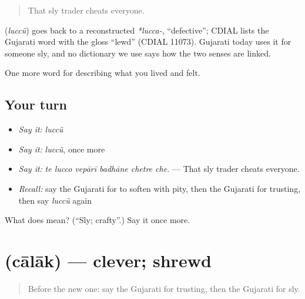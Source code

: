 \begin{quote}
That sly trader cheats everyone.
\end{quote}

\begin{cousinweb}
\textbf{} (\emph{luccũ}) goes back to a reconstructed \emph{*lucca-}, \textquotedblleft{}defective\textquotedblright{}; CDIAL lists the Gujarati word with the gloss \textquotedblleft{}lewd\textquotedblright{} (CDIAL 11073). Gujarati today uses it for someone sly, and no dictionary we use says how the two senses are linked.
\end{cousinweb}

\begin{grammarlens}[title={What you've built}]
One more word for describing what you lived and felt.
\end{grammarlens}

\subsection*{Your turn}
\begin{itemize}
\raggedright
  \item \emph{Say it:} \emph{luccũ}
  \item \emph{Say it:} \emph{luccũ}, once more
  \item \emph{Say it:} \emph{te lucco vepārī badhāne chetre che.} — That sly trader cheats everyone.
  \item \emph{Recall:} say the Gujarati for to soften with pity, then the Gujarati for trusting, then say \emph{luccũ} again
\end{itemize}

\begin{tcolorbox}[breakable,colback=teal!4,colframe=teal!35!black,title={Before you move on}]
What does  mean? (\textquotedblleft{}Sly; crafty\textquotedblright{}.) Say it once more.
\end{tcolorbox}
\section[\texorpdfstring{\gu{ચાલાક} (cālāk)}{ચાલાક (cālāk)}]{ (cālāk) — clever; shrewd}

\label{lesson:GU-C460-calak}



\begin{quote}
Before the new one: say the Gujarati for trusting, then the Gujarati for sly.
\end{quote}

